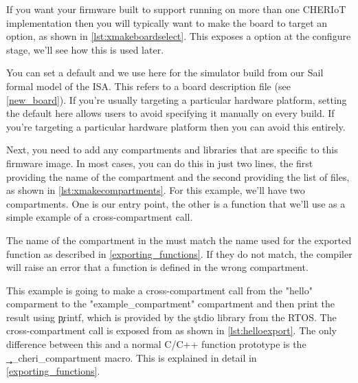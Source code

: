 If you want your firmware built to support running on more than one CHERIoT implementation then you will typically want to make the board to target an option, as shown in \ref{lst:xmakeboardselect}.
This exposes a  option at the configure stage, we'll see how this is used later.

\lualisting[filename=examples/hello_world/xmake.lua,marker=board,label=lst:xmakeboardselect,caption="Build system code for allowing the board to be selected at configure time"]{}

You can set a default and we use  here for the simulator build from our Sail formal model of the ISA.
This refers to a board description file (see \ref{new_board}).
If you're usually targeting a particular hardware platform, setting the default here allows users to avoid specifying it manually on every build.
If you're  targeting a particular hardware platform then you can avoid this entirely.

Next, you need to add any compartments and libraries that are specific to this firmware image.
In most cases, you can do this in just two lines, the first providing the name of the compartment and the second providing the list of files, as shown in \ref{lst:xmakecompartments}.
For this example, we'll have two compartments.
One is our entry point, the other is a function that we'll use as a simple example of a cross-compartment call.

\lualisting[filename=examples/hello_world/xmake.lua,marker=compartments,label=lst:xmakecompartments,caption="Build system code for building compartments"]{}

\begin{caution}
	The name of the compartment in the  must match the name used for the exported function as described in \ref{exporting_functions}.
	If they do not match, the compiler will raise an error that a function is defined in the wrong compartment.
\end{caution}

This example is going to make a cross-compartment call from the "hello" comparment to the "example_compartment" compartment and then print the result using \c{printf}, which is provided by the \c{stdio} library from the RTOS.
The cross-compartment call is exposed from  as shown in \ref{lst:helloexport}.
The only difference between this and a normal C/C++ function prototype is the \c{__cheri_compartment} macro.
This is explained in detail in \ref{exporting_functions}.

